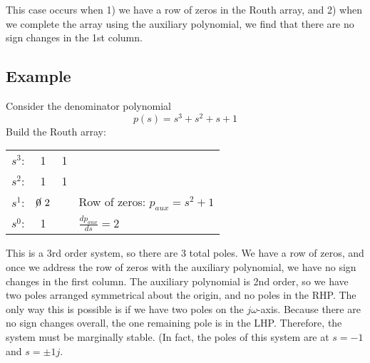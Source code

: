 \documentclass{book}
\begin{document}
This case occurs when 1) we have a row of zeros in the Routh array, and 2) when we complete the array using the auxiliary polynomial, we find that there are no sign changes in the 1st column. 

\subsection*{Example}
Consider the denominator polynomial
\[ p(s)=s^3+s^2+s+1 \]
Build the Routh array:
\begin{center}
	\begin{tabular}{c c c l}\vspace{1em}
		$ s^3 $: &  1 & 1 & \\ \vspace{1em}
		$ s^2 $: &  1 & 1 & \\ \vspace{1em}
		$ s^1 $: & $ \cancel{0}{\ 2} $ & & Row of zeros: $ p_{aux}=s^2+1 $ \\ \vspace{1em}
		$ s^0 $: & 1 & & \hspace{4em} $ \frac{dp_{aux}}{ds} = 2 $
	\end{tabular}
\end{center}
This is a 3rd order system, so there are 3 total poles. We have a row of zeros, and once we address the row of zeros with the auxiliary polynomial, we have no sign changes in the first column. The auxiliary polynomial is 2nd order, so we have two poles arranged symmetrical about the origin, and no poles in the RHP. The only way this is possible is if we have two poles on the $ j\omega $-axis. Because there are no sign changes overall, the one remaining pole is in the LHP. Therefore, the system must be marginally stable. (In fact, the poles of this system are at $ s=-1 $ and $ s=\pm1j $.
\end{document}
